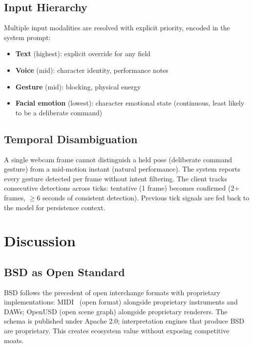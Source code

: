 \documentclass{article}
\begin{document}
\subsection{Input Hierarchy}

Multiple input modalities are resolved with explicit priority, encoded in the system prompt:

\begin{itemize}\tightlist
  \item \textbf{Text} (highest): explicit override for any field
  \item \textbf{Voice} (mid): character identity, performance notes
  \item \textbf{Gesture} (mid): blocking, physical energy
  \item \textbf{Facial emotion} (lowest): character emotional state (continuous, least likely to be a deliberate command)
\end{itemize}

\subsection{Temporal Disambiguation}

A single webcam frame cannot distinguish a held pose (deliberate command gesture) from a mid-motion instant (natural performance). The system reports every gesture detected per frame without intent filtering. The client tracks consecutive detections across ticks: tentative (1 frame) becomes confirmed (2+ frames, $\geq$6 seconds of consistent detection). Previous tick signals are fed back to the model for persistence context.

\section{Discussion}\label{sec:discussion}

\subsection{BSD as Open Standard}

BSD follows the precedent of open interchange formats with proprietary implementations: MIDI~\cite{midi1983} (open format) alongside proprietary instruments and DAWs; OpenUSD (open scene graph) alongside proprietary renderers. The schema is published under Apache 2.0; interpretation engines that produce BSD are proprietary. This creates ecosystem value without exposing competitive moats.
\end{document}
